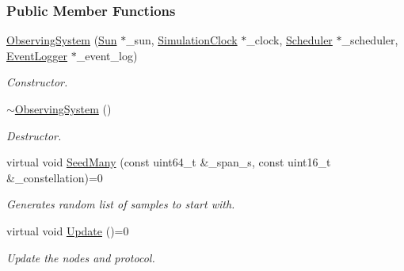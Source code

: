 \subsubsection*{Public Member Functions}
\begin{DoxyCompactItemize}
\item 
\hyperlink{classosse_1_1collaborate_1_1_observing_system_a9cde3752308908b32f882ea8c529e7e2}{Observing\+System} (\hyperlink{classosse_1_1collaborate_1_1_sun}{Sun} $\ast$\+\_\+sun, \hyperlink{classosse_1_1collaborate_1_1_simulation_clock}{Simulation\+Clock} $\ast$\+\_\+clock, \hyperlink{classosse_1_1collaborate_1_1_scheduler}{Scheduler} $\ast$\+\_\+scheduler, \hyperlink{classosse_1_1collaborate_1_1_event_logger}{Event\+Logger} $\ast$\+\_\+event\+\_\+log)
\begin{DoxyCompactList}\small\item\em Constructor. \end{DoxyCompactList}\item 
\mbox{\label{classosse_1_1collaborate_1_1_observing_system_a552670acae91c52b06296a0118e7871b}} 
\hyperlink{classosse_1_1collaborate_1_1_observing_system_a552670acae91c52b06296a0118e7871b}{$\sim$\+Observing\+System} ()
\begin{DoxyCompactList}\small\item\em Destructor. \end{DoxyCompactList}\item 
virtual void \hyperlink{classosse_1_1collaborate_1_1_observing_system_ae324ec9fd51b8e65afd80292748b406c}{Seed\+Many} (const uint64\+\_\+t \&\+\_\+span\+\_\+s, const uint16\+\_\+t \&\+\_\+constellation)=0
\begin{DoxyCompactList}\small\item\em Generates random list of samples to start with. \end{DoxyCompactList}\item 
\mbox{\label{classosse_1_1collaborate_1_1_observing_system_a8ebba43b54a5c7bb28e7721e7b1f8d9b}} 
virtual void \hyperlink{classosse_1_1collaborate_1_1_observing_system_a8ebba43b54a5c7bb28e7721e7b1f8d9b}{Update} ()=0
\begin{DoxyCompactList}\small\item\em Update the nodes and protocol. \end{DoxyCompactList}\item 

\end{DoxyCompactItemize}
